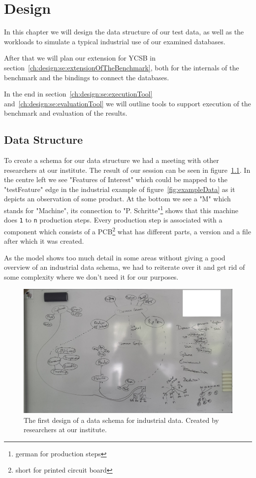 \chapter{Design}
\label{ch:design}
In this chapter we will design the data structure of our test data,
as well as the workloads to simulate a typical industrial use of our examined databases.

After that we will plan our extension for YCSB in section~\ref{ch:design:se:extensionOfTheBenchmark},
both for the internals of the benchmark and the bindings to connect the databases.

In the end in section~\ref{ch:design:se:executionTool} and~\ref{ch:design:se:evaluationTool} we will outline tools to support execution of the benchmark and evaluation of the results.

\section{Data Structure}
\label{ch:design:se:dataStructure}
To create a schema for our data structure we had a meeting with other researchers at our institute.
The result of our session can be seen in figure~\ref{fig:firstDesignOfSchema}.
In the centre left we see "Features of Interest" which could be mapped to the "testFeature" edge in the industrial example of figure~\ref{fig:exampleData} as it depicts an observation of some product.
At the bottom we see a "M" which stands for "Machine",
its connection to "P. Schritte"\footnote{german for production steps} shows that this machine does \texttt{1} to \texttt{n} production steps.
Every production step is associated with a component which consists of a PCB\footnote{short for printed circuit board} what has different parts,
a version and a file after which it was created.

As the model shows too much detail in some areas without giving a good overview of an industrial data schema,
we had to reiterate over it and get rid of some complexity where we don't need it for our purposes.

\begin{figure}
  \centering
  \includegraphics[width=\textwidth]{images/design/firstDesignOfSchema}
  \caption{The first design of a data schema for industrial data. Created by researchers at our institute.}
  \label{fig:firstDesignOfSchema}
\end{figure}

